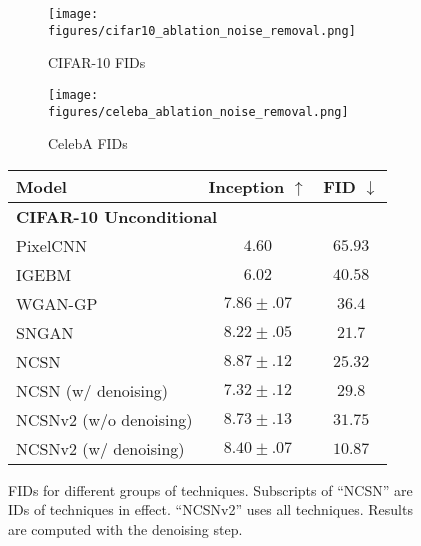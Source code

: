 \documentclass{article}
\begin{document}
\begin{figure}
    \centering
    \begin{minipage}{0.53\textwidth}
        \centering
            \begin{subfigure}[b]{0.5\textwidth}
            \texttt{[image: figures/cifar10\_ablation\_noise\_removal.png]}
            \caption{CIFAR-10 FIDs}\label{fig:fid_cifar10}
        \end{subfigure}\begin{subfigure}[b]{0.5\textwidth}
            \texttt{[image: figures/celeba\_ablation\_noise\_removal.png]}
            \caption{CelebA FIDs}\label{fig:fid_celeba}
        \end{subfigure}
        \caption{FIDs for different groups of techniques. Subscripts of ``NCSN'' are IDs of techniques in effect. ``NCSNv2'' uses all techniques. Results are computed with the denoising step.}
        \label{fig:ablation}
    \end{minipage}
    \begin{minipage}{0.45\textwidth}
     \label{tab:full_scores}
    \vspace{-0.5em}
       \centering
            \begin{adjustbox}{max width=0.9\linewidth}
            \begin{tabular}{lcc}
                \toprule
                Model & Inception $\uparrow$ & FID $\downarrow$\\
                \midrule
                \multicolumn{3}{l}{\textbf{CIFAR-10 Unconditional}} \\
                \midrule
                PixelCNN~\cite{van2016conditional} & $4.60$ & $65.93$\\
                IGEBM~\cite{du2019implicit} & $6.02$ & $40.58$ \\
                WGAN-GP~\cite{gulrajani2017improved} & $7.86 \pm .07$ & $36.4$\\
                SNGAN~\cite{miyato2018spectral} & $8.22\pm .05$ & $21.7$ \\
                \midrule
                NCSN~\cite{song2019generative} & $\mathbf{8.87 \pm .12}$ & $25.32$\\
                NCSN (w/ denoising) & $7.32 \pm .12$ & $29.8$\\
                NCSNv2 (w/o denoising) & $8.73 \pm .13$ & $31.75$\\
                NCSNv2 (w/ denoising) & $8.40 \pm .07$ & $\mathbf{10.87}$\\

\end{tabular}
\end{adjustbox}
\end{minipage}
\end{figure}
\end{document}
